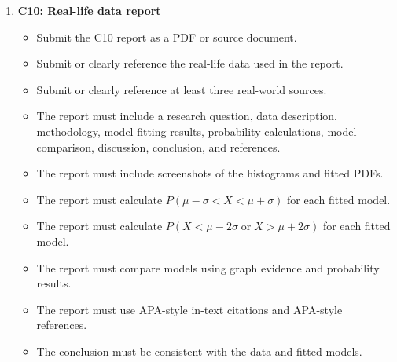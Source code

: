 \documentclass[12pt]{article}
\begin{document}
\begin{enumerate}
		\item \textbf{C10: Real-life data report}
		\begin{itemize}
			\item Submit the C10 report as a PDF or source document.
			\item Submit or clearly reference the real-life data used in the report.
			\item Submit or clearly reference at least three real-world sources.
			\item The report must include a research question, data description, methodology, model fitting results, probability calculations, model comparison, discussion, conclusion, and references.
			\item The report must include screenshots of the histograms and fitted PDFs.
			\item The report must calculate \(P(\mu-\sigma<X<\mu+\sigma)\) for each fitted model.
			\item The report must calculate \(P(X<\mu-2\sigma\;\text{or}\;X>\mu+2\sigma)\) for each fitted model.
			\item The report must compare models using graph evidence and probability results.
			\item The report must use APA-style in-text citations and APA-style references.
			\item The conclusion must be consistent with the data and fitted models.
		\end{itemize}
	\end{enumerate}
	
\end{document}
